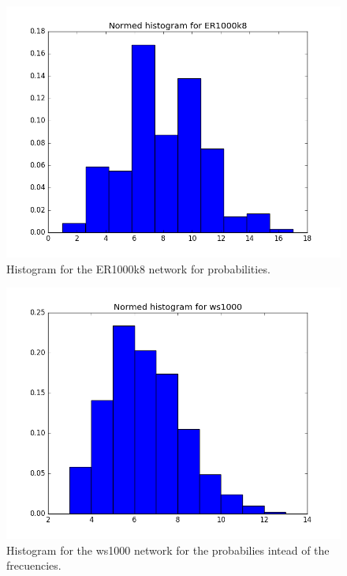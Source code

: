 \documentclass[12pt,a4paper,oneside]{article}
\numberwithin{equation}{section}
\numberwithin{equation}{section}
\theoremstyle{definition}
\begin{document}
\begin{figure}[h!]
	\centering
	\includegraphics[scale=0.5]{images/norm_ER1000k8.png}
	\caption{Histogram for the ER1000k8 network for probabilities.}
	\label{airport}
\end{figure}

\begin{figure}[h!]
	\centering
	\includegraphics[scale=0.5]{images/norm_ws1000.png}
	\caption{Histogram for the ws1000 network for the probabilies intead of the frecuencies.}
	\label{airport}
\end{figure}
\end{document}
